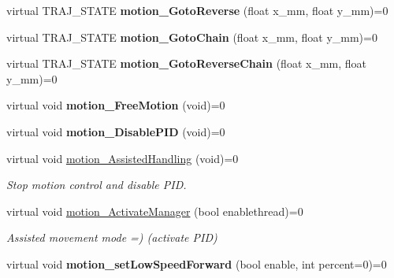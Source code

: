 \begin{DoxyCompactItemize}
virtual T\+R\+A\+J\+\_\+\+S\+T\+A\+TE {\bfseries motion\+\_\+\+Goto\+Reverse} (float x\+\_\+mm, float y\+\_\+mm)=0
\item 
\mbox{\label{classAAsservDriver_ab8a6a390e76b8999c59a28c2e8190106}} 
virtual T\+R\+A\+J\+\_\+\+S\+T\+A\+TE {\bfseries motion\+\_\+\+Goto\+Chain} (float x\+\_\+mm, float y\+\_\+mm)=0
\item 
\mbox{\label{classAAsservDriver_afa0de8f03c96e899d5339d394295c560}} 
virtual T\+R\+A\+J\+\_\+\+S\+T\+A\+TE {\bfseries motion\+\_\+\+Goto\+Reverse\+Chain} (float x\+\_\+mm, float y\+\_\+mm)=0
\item 
\mbox{\label{classAAsservDriver_aca4741e0e7e11947180f53ba8abe0730}} 
virtual void {\bfseries motion\+\_\+\+Free\+Motion} (void)=0
\item 
\mbox{\label{classAAsservDriver_a3d4f4d2a80ee1887212f38fda3094c26}} 
virtual void {\bfseries motion\+\_\+\+Disable\+P\+ID} (void)=0
\item 
\mbox{\label{classAAsservDriver_a83153736da05eba6451f02b399eb4438}} 
virtual void \hyperlink{classAAsservDriver_a83153736da05eba6451f02b399eb4438}{motion\+\_\+\+Assisted\+Handling} (void)=0
\begin{DoxyCompactList}\small\item\em Stop motion control and disable P\+ID. \end{DoxyCompactList}\item 
\mbox{\label{classAAsservDriver_a046eb790d147ad8ec34bcd9565ad675b}} 
virtual void \hyperlink{classAAsservDriver_a046eb790d147ad8ec34bcd9565ad675b}{motion\+\_\+\+Activate\+Manager} (bool enablethread)=0
\begin{DoxyCompactList}\small\item\em Assisted movement mode =) (activate P\+ID) \end{DoxyCompactList}\item 
\mbox{\label{classAAsservDriver_a6912c759115a6357b3ce8ce55f365663}} 
virtual void {\bfseries motion\+\_\+set\+Low\+Speed\+Forward} (bool enable, int percent=0)=0
\item 
\mbox{\label{classAAsservDriver_a621a0b60fec76be04f8960f2e56ba5fe}} 

\end{DoxyCompactItemize}
